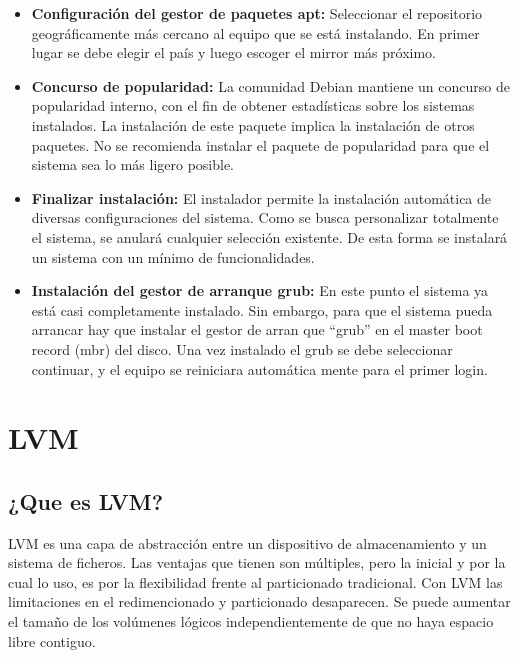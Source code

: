 \begin{itemize}
			\item \textbf{Configuración del gestor de paquetes apt:} Seleccionar el repositorio geográficamente más cercano al equipo que se está instalando. En primer lugar se debe elegir el país y luego escoger el mirror más próximo.
			
			\item \textbf{Concurso de popularidad:} La comunidad Debian mantiene un concurso de popularidad interno, con el fin de obtener estadísticas sobre los sistemas instalados. La instalación de este	paquete implica la instalación de otros paquetes. No se recomienda instalar el paquete de popularidad para que el sistema sea lo más ligero posible.
			
			\item \textbf{Finalizar instalación:} El instalador permite la instalación automática de diversas configuraciones del sistema. Como se busca personalizar totalmente el sistema, se anulará cualquier selección existente. De esta forma se instalará un sistema con un mínimo de funcionalidades.
			
			\item \textbf{Instalación del gestor de arranque grub:} En este punto el sistema ya está casi completamente instalado. Sin embargo, para que el sistema pueda arrancar hay que instalar el gestor de arran	que “grub” en el master boot record (mbr) del disco.
			Una vez instalado el grub se debe seleccionar continuar, y el equipo se reiniciara automática mente para el primer login.
		
		\end{itemize}
	
	\section{LVM}
	
		\subsection{¿Que es LVM?}
		
			LVM es una capa de abstracción entre un dispositivo de almacenamiento y un sistema de ficheros. Las ventajas que tienen son múltiples, pero la inicial y por la cual lo uso, es por la flexibilidad frente al particionado tradicional. Con LVM las limitaciones en el redimencionado y particionado desaparecen. Se puede aumentar el tamaño  de los volúmenes lógicos independientemente de que no haya espacio libre contiguo.
				
